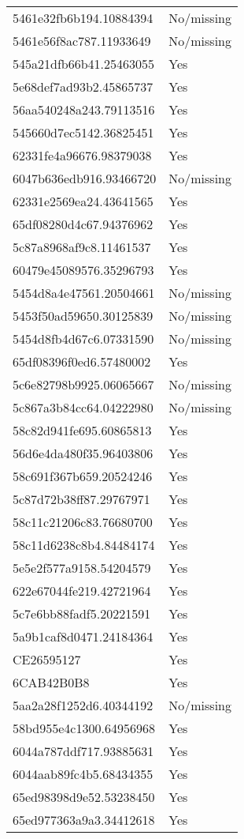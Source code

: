 \begin{tabular}{ll}
5461e32fb6b194.10884394 & No/missing \\
5461e56f8ac787.11933649 & No/missing \\
545a21dfb66b41.25463055 & Yes \\
5e68def7ad93b2.45865737 & Yes \\
56aa540248a243.79113516 & Yes \\
545660d7ec5142.36825451 & Yes \\
62331fe4a96676.98379038 & Yes \\
6047b636edb916.93466720 & No/missing \\
62331e2569ea24.43641565 & Yes \\
65df08280d4c67.94376962 & Yes \\
5c87a8968af9c8.11461537 & Yes \\
60479e45089576.35296793 & Yes \\
5454d8a4e47561.20504661 & No/missing \\
5453f50ad59650.30125839 & No/missing \\
5454d8fb4d67c6.07331590 & No/missing \\
65df08396f0ed6.57480002 & Yes \\
5c6e82798b9925.06065667 & No/missing \\
5c867a3b84cc64.04222980 & No/missing \\
58c82d941fe695.60865813 & Yes \\
56d6e4da480f35.96403806 & Yes \\
58c691f367b659.20524246 & Yes \\
5c87d72b38ff87.29767971 & Yes \\
58c11c21206c83.76680700 & Yes \\
58c11d6238c8b4.84484174 & Yes \\
5e5e2f577a9158.54204579 & Yes \\
622e67044fe219.42721964 & Yes \\
5c7e6bb88fadf5.20221591 & Yes \\
5a9b1caf8d0471.24184364 & Yes \\
CE26595127 & Yes \\
6CAB42B0B8 & Yes \\
5aa2a28f1252d6.40344192 & No/missing \\
58bd955e4c1300.64956968 & Yes \\
6044a787ddf717.93885631 & Yes \\
6044aab89fc4b5.68434355 & Yes \\
65ed98398d9e52.53238450 & Yes \\
65ed977363a9a3.34412618 & Yes \\

\end{tabular}
